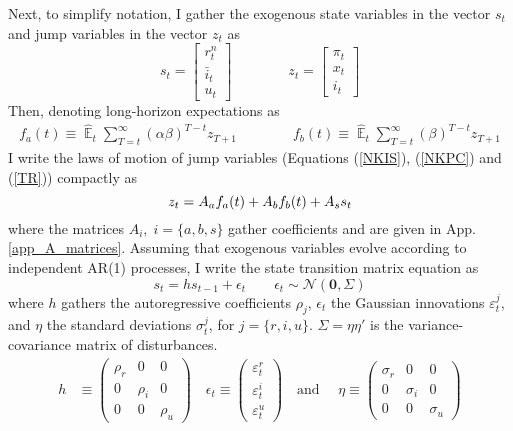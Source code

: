 \documentclass[11pt]{article}
\renewcommand{\[}{\begin{equation}}
\renewcommand{\]}{\end{equation}}
\DeclareMathOperator{\E}{\mathbb{E}}
\begin{document}
Next, to simplify notation, I gather the exogenous state variables in the vector $s_t$ and jump variables in the vector $z_t$ as
\begin{equation}
s_t =  \begin{bmatrix}r_t^n \\ \bar{i}_t \\ u_t \end{bmatrix} \quad \quad \quad \quad  z_t = \begin{bmatrix}\pi_t \\ x_t \\ i_t \end{bmatrix}
\end{equation}
Then, denoting long-horizon expectations as 
 \begin{align}
f_a(t)  \equiv  \hat{\E}_t\sum_{T=t}^{\infty} (\alpha\beta)^{T-t } z_{T+1} \quad \quad \quad \quad f_b(t)  \equiv \hat{\E}_t\sum_{T=t}^{\infty} (\beta)^{T-t } z_{T+1} \label{fafb}
\end{align}
I write the laws of motion of jump variables (Equations (\ref{NKIS}), (\ref{NKPC}) and (\ref{TR})) compactly as
\begin{equation}
z_t  = A_af_a(t) + A_b f_b(t) + A_s s_t \label{LOM_LR} \\
\end{equation}
where the matrices $A_i, \; i=\{a,b,s\}$ gather coefficients and are given in App. \ref{app_A_matrices}. Assuming that exogenous variables evolve according to independent AR(1) processes, I write the state transition matrix equation as
 \begin{equation}
 s_t  = h s_{t-1} + \epsilon_t  \quad \quad \epsilon_t \sim \mathcal{N}(\mathbf{0}, \Sigma) \label{exog}
 \end{equation}
where $h$ gathers the autoregressive coefficients $\rho_j$, $\epsilon_t$ the Gaussian innovations $\varepsilon_t^j$, and $\eta$ the standard deviations $\sigma_t^j$, for $j=\{r,i,u\}$. $\Sigma = \eta \eta'$  is the variance-covariance matrix of disturbances.
 \begin{align}
 h  & \equiv \begin{pmatrix} \rho_r & 0 & 0 \\ 0& \rho_i & 0 \\ 0&0& \rho_u 
 \end{pmatrix}  \quad 
 \epsilon_t \equiv \begin{pmatrix}\varepsilon_t^{r} \\ \varepsilon_t^{i}  \\ \varepsilon_t^{u} 
 \end{pmatrix}  \quad  \text{and } \quad \eta  \equiv \begin{pmatrix} \sigma_r & 0 & 0 \\ 0& \sigma_i & 0 \\ 0&0& \sigma_u 
 \end{pmatrix} 
 \end{align}
\end{document}
